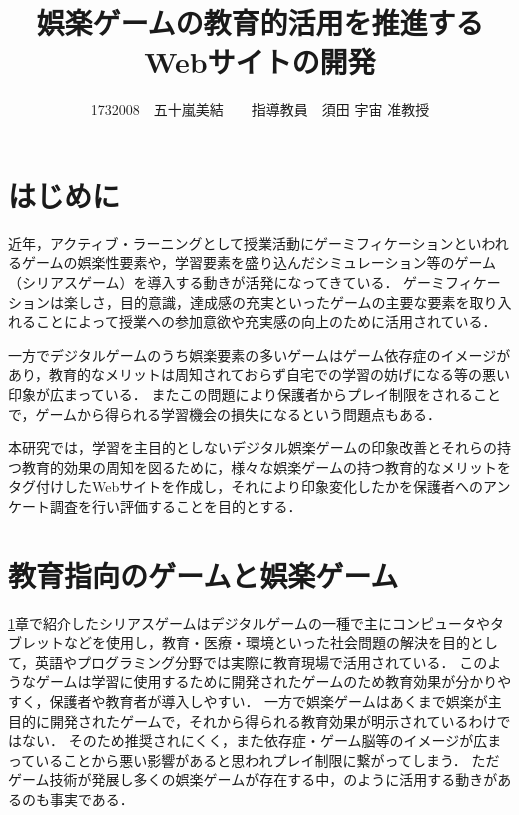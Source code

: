 \documentclass[twocolumn,10pt,a4j]{ltjsarticle}
\title{娯楽ゲームの教育的活用を推進するWebサイトの開発}
\author{1732008　五十嵐美結　　指導教員　須田 宇宙 准教授}
\date{}
\begin{document}
\maketitle

\section{はじめに}\label{introduction}

近年，アクティブ・ラーニングとして授業活動にゲーミフィケーションといわれるゲームの娯楽性要素や，学習要素を盛り込んだシミュレーション等のゲーム（シリアスゲーム）を導入する動きが活発になってきている．
ゲーミフィケーションは楽しさ，目的意識，達成感の充実といったゲームの主要な要素を取り入れることによって授業への参加意欲や充実感の向上のために活用されている．


一方でデジタルゲームのうち娯楽要素の多いゲームはゲーム依存症のイメージがあり，教育的なメリットは周知されておらず自宅での学習の妨げになる等の悪い印象が広まっている．
またこの問題により保護者からプレイ制限をされることで，ゲームから得られる学習機会の損失になるという問題点もある．

本研究では，学習を主目的としないデジタル娯楽ゲームの印象改善とそれらの持つ教育的効果の周知を図るために，様々な娯楽ゲームの持つ教育的なメリットをタグ付けしたWebサイトを作成し，それにより印象変化したかを保護者へのアンケート調査を行い評価することを目的とする．

\section{教育指向のゲームと娯楽ゲーム}

\ref{introduction}章で紹介したシリアスゲームはデジタルゲームの一種で主にコンピュータやタブレットなどを使用し，教育・医療・環境といった社会問題の解決を目的として，英語やプログラミング分野では実際に教育現場で活用されている．
このようなゲームは学習に使用するために開発されたゲームのため教育効果が分かりやすく，保護者や教育者が導入しやすい．
一方で娯楽ゲームはあくまで娯楽が主目的に開発されたゲームで，それから得られる教育効果が明示されているわけではない．
そのため推奨されにくく，また依存症・ゲーム脳等のイメージが広まっていることから悪い影響があると思われプレイ制限に繋がってしまう．
ただゲーム技術が発展し多くの娯楽ゲームが存在する中，\cite{tvgame}のように活用する動きがあるのも事実である．
\end{document}
